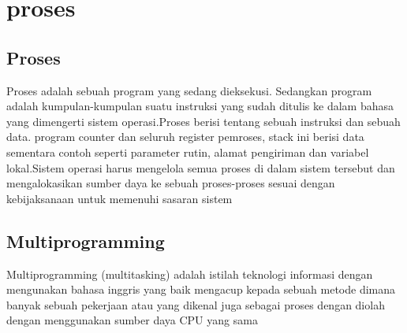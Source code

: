 
\section{proses}

	\subsection{Proses}	
	Proses adalah sebuah  program yang sedang dieksekusi. Sedangkan program adalah kumpulan-kumpulan  suatu  instruksi yang sudah  ditulis ke dalam bahasa yang dimengerti sistem operasi.Proses berisi tentang  sebuah instruksi dan sebuah  data. program counter dan seluruh register pemroses, stack ini  berisi data sementara contoh  seperti parameter rutin, alamat pengiriman dan variabel lokal.Sistem operasi harus mengelola semua proses di dalam sistem tersebut dan mengalokasikan sumber daya ke sebuah  proses-proses sesuai dengan kebijaksanaan untuk memenuhi sasaran sistem

	\subsection{Multiprogramming}
	Multiprogramming (multitasking) adalah  istilah teknologi informasi dengan mengunakan bahasa inggris yang baik  mengacup kepada sebuah metode dimana banyak sebuah pekerjaan atau yang dikenal juga sebagai proses  dengan diolah dengan menggunakan sumber daya CPU yang sama